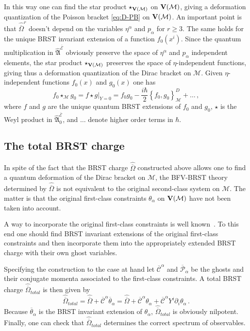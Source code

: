 \documentclass[a4paper,11pt]{amsart}
\numberwithin{thm}{section} %
\numberwithin{equation}{section} %
\numberwithin{figure}{section} %
\newcommand{\pb}[2]{\left\{{}#1{},{}#2{}\right\}}
\renewcommand{\:}{{\rm\, :\,}}
\def\bar{\overline}
\def\d{\partial}
\def\cP{{\mathcal P}}
\def\cc{{\mathcal C}}
\def\manM{{\mathcal M}}
\def\qA{{\hat{\mathfrak A}}}
\def\E{{ \mathcal E}}
\def\V{{\bf V}}
\begin{document}
In this way one can find the star product $\star_{\V(\manM)}$ on
$\V(\manM)$, giving a deformation quantization of the Poisson bracket
\eqref{eq:D-PB} on $\V(\manM)$.  An important point is that
${\hat{\bar\Omega}}^r$ doesn't depend on the variables $\eta^\alpha$ and
$p_\alpha$ for $r\geq 3$.  The same holds for the unique BRST
invariant extension of a function $f_0(x^i)$.  Since the quantum
multiplication in $\qA^{\bar\E}$ obviously preserve the space of
$\eta^\alpha$ and $p_\alpha$ independent elements, the star product
$\star_{\V(\manM)}$ preserves the space of $\eta$-independent
functions, giving thus a deformation quantization of the Dirac bracket on
$\manM$. Given $\eta$-independent functions $f_0(x)$ and $g_0(x)$ one
has
\begin{equation}
\label{eq:star-a}
  f_0\star_\manM g_0=f \star g |_{Y=0}=f_0
  g_0-\frac{i\hbar}{2}\pb{f_0}{g_0}^D_{\manM}+\ldots\,,
\end{equation}
where $f$ and $g$ are the unique quantum BRST extensions of $f_0$ and
$g_0$, $\star$ is the Weyl product in $\qA^{\bar\E}_0$, and $\ldots$
denote higher order terms in $\hbar$.


\subsection{The total BRST charge}
In spite of the fact that the BRST charge $\hat{\bar\Omega}$
constructed above allows one to find a quantum deformation of the Dirac
bracket on $\manM$, the BFV-BRST theory determined by $\hat{\bar\Omega}$ is
not equivalent to the original second-class system on $\manM$.
The matter is that the original first-class constraints $\theta_\alpha$ on
$\V(\manM)$ have not been taken into account.


A way to incorporate the original first-class constraints is well
known~\cite{[BFF],[BT]}. To this end one should find
BRST invariant extensions of the original first-class
constraints and then incorporate them into the appropriately
extended BRST charge with their own ghost variables.

Specifying the construction to the case at hand let ${\bar\cc}^\alpha$
and ${\bar\cP}_\alpha$ be the ghosts and their conjugate momenta
associated to the first-class constraints.
A total BRST charge ${\hat{\bar\Omega}}_{total}$
is then given by
\begin{equation}
  {\hat{\bar\Omega}}_{total}={\hat{\bar\Omega}}+{\bar\cc}^\alpha{\bar\theta}_\alpha=
{\hat{\bar\Omega}}+{\bar\cc}^\alpha{\theta}_\alpha
+{\bar\cc}^\alpha Y^i\d_i\theta_\alpha\,.
\end{equation}
Because $\bar\theta_\alpha$ is the BRST invariant extension of
$\theta_\alpha$, ${\hat{\bar\Omega}}_{total}$ is obviously nilpotent.
Finally, one can check that ${\hat{\bar\Omega}}_{total}$ determines
the correct spectrum of observables.
\end{document}
